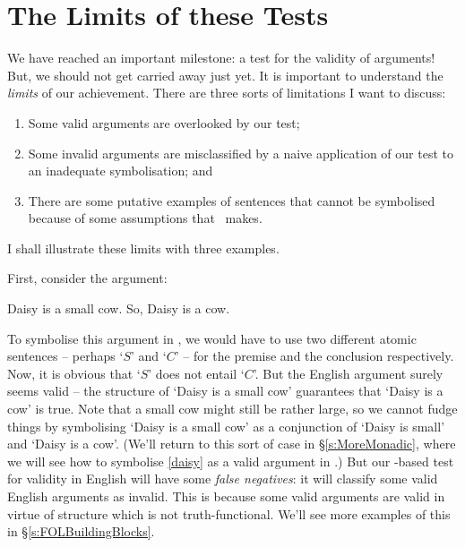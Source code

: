 \section{The Limits of these Tests}\label{s:ParadoxesOfMaterialConditional}
We have reached an important milestone: a test for the validity of arguments! But, we should not get carried away just yet. It is important to understand the \emph{limits} of our achievement. There are three sorts of limitations I want to discuss: \begin{enumerate}
	\item Some valid arguments are overlooked by our test;
	\item Some invalid arguments are misclassified by a naive application of our test to an inadequate symbolisation; and
	\item There are some putative examples of sentences that cannot be symbolised because of some assumptions that \TFL\ makes.
\end{enumerate}
I shall illustrate these limits with three examples.

First, consider the argument: 
	\begin{earg}
		\item[\ex{daisy}] Daisy is a small cow. So, Daisy is a cow.
	\end{earg}
To symbolise this argument in \TFL, we would have to use two different atomic sentences – perhaps `$S$'  and `$C$' – for the premise and the conclusion respectively. Now, it is obvious that `$S$' does not entail `$C$'. But the English argument surely seems valid – the structure of `Daisy is a small cow' guarantees that `Daisy is a cow' is true. Note that a small cow might still be rather large, so we cannot fudge things by symbolising `Daisy is a small cow' as a conjunction of `Daisy is small' and `Daisy is a cow'. (We'll return to this sort of case in §\ref{s:MoreMonadic}, where we will see how to symbolise \ref{daisy} as a valid argument in \FOL.) But our \TFL-based test for validity in English will have some \emph{false negatives}: it will classify some valid English arguments as invalid. This is because some valid arguments are valid in virtue of structure which is not truth-functional. We'll see more examples of this in §\ref{s:FOLBuildingBlocks}. 

